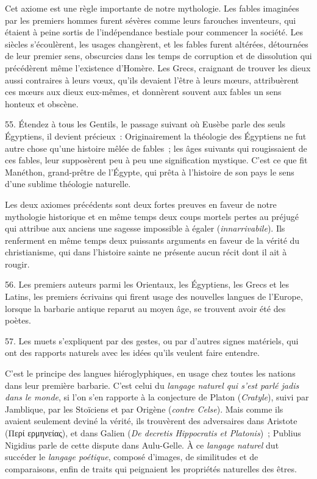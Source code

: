 \documentclass[french,twoside]{book} %
\begin{document}
Cet axiome est une règle importante de notre mythologie. Les fables imaginées par les premiers hommes furent sévères comme leurs farouches inventeurs, qui étaient à peine sortis de l’indépendance bestiale pour commencer la société. Les siècles s’écoulèrent, les usages changèrent, et les fables furent altérées, détournées de leur premier sens, obscurcies dans les temps de corruption et de dissolution qui précédèrent même l’existence d’Homère. Les Grecs, craignant de trouver les dieux aussi contraires à leurs vœux, qu’ils devaient l’être à leurs  mœurs, attribuèrent ces mœurs aux dieux eux-mêmes, et donnèrent souvent aux fables un sens honteux et obscène.\par
55. Étendez à tous les Gentils, le passage suivant où Eusèbe parle des seuls Égyptiens, il devient précieux : Originairement la théologie des Égyptiens ne fut autre chose qu’une histoire mêlée de fables ; les âges suivants qui rougissaient de ces fables, leur supposèrent peu à peu une signification mystique. C’est ce que fit Manéthon, grand-prêtre de l’Égypte, qui prêta à l’histoire de son pays le sens d’une sublime théologie naturelle.\par
Les deux axiomes précédents sont deux fortes preuves en faveur de notre mythologie historique et en même temps deux coups mortels pertes au préjugé qui attribue aux anciens une sagesse impossible à égaler ({\itshape innarrivabile}). Ils renferment en même temps deux puissants arguments en faveur de la vérité du christianisme, qui dans l’histoire sainte ne présente aucun récit dont il ait à rougir.\par
56. Les premiers auteurs parmi les Orientaux, les Égyptiens, les Grecs et les Latins, les premiers écrivains qui firent usage des nouvelles langues de l’Europe, lorsque la barbarie antique reparut au moyen âge, se trouvent avoir été des poètes.\par
57. Les muets s’expliquent par des gestes, ou par d’autres signes matériels, qui ont des rapports  naturels avec les idées qu’ils veulent faire entendre.\par
C’est le principe des langues hiéroglyphiques, en usage chez toutes les nations dans leur première barbarie. C’est celui du {\itshape langage naturel qui s’est parlé jadis dans le monde}, si l’on s’en rapporte à la conjecture de Platon ({\itshape Cratyle}), suivi par Jamblique, par les Stoïciens et par Origène ({\itshape contre Celse}). Mais comme ils avaient seulement deviné la vérité, ils trouvèrent des adversaires dans Aristote (Περί ερμηνείας), et dans Galien ({\itshape De decretis Hippocratis et Platonis}) ; Publius Nigidius parle de cette dispute dans Aulu-Gelle. À ce {\itshape langage naturel} dut succéder le {\itshape langage poétique}, composé d’images, de similitudes et de comparaisons, enfin de traits qui peignaient les propriétés naturelles des êtres.\par
\end{document}
